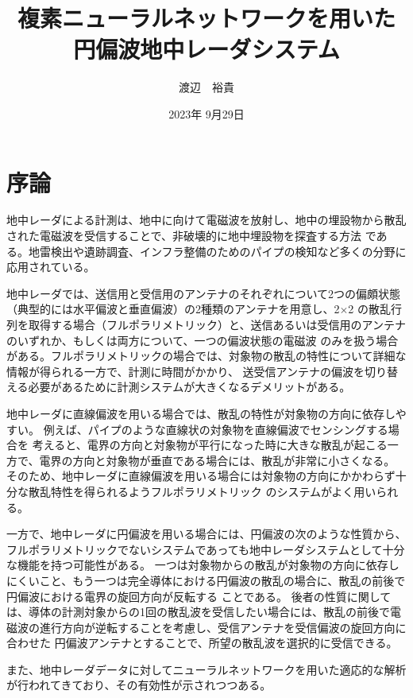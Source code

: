 \documentclass[11pt,a4paper,uplatex]{ujarticle}
\title{複素ニューラルネットワークを用いた\\円偏波地中レーダシステム}
\date{2023年 9月29日}
\author{渡辺　裕貴}
\begin{document}
\maketitle
\newpage
\tableofcontents
\newpage
\section{序論}

  地中レーダによる計測は、地中に向けて電磁波を放射し、地中の埋設物から散乱された電磁波を受信することで、非破壊的に地中埋設物を探査する方法
  である。地雷検出や遺跡調査、インフラ整備のためのパイプの検知など多くの分野に応用されている\cite{landmine_example}\cite{remains_example}。

  地中レーダでは、送信用と受信用のアンテナのそれぞれについて2つの偏頗状態（典型的には水平偏波と垂直偏波）の2種類のアンテナを用意し、2$\times$2
  の散乱行列を取得する場合（フルポラリメトリック）と、送信あるいは受信用のアンテナのいずれか、もしくは両方について、一つの偏波状態の電磁波
  のみを扱う場合がある。フルポラリメトリックの場合では、対象物の散乱の特性について詳細な情報が得られる一方で、計測に時間がかかり、
  送受信アンテナの偏波を切り替える必要があるために計測システムが大きくなるデメリットがある。

  地中レーダに直線偏波を用いる場合では、散乱の特性が対象物の方向に依存しやすい。
  例えば、パイプのような直線状の対象物を直線偏波でセンシングする場合を
  考えると、電界の方向と対象物が平行になった時に大きな散乱が起こる一方で、電界の方向と対象物が垂直である場合には、散乱が非常に小さくなる。
  そのため、地中レーダに直線偏波を用いる場合には対象物の方向にかかわらず十分な散乱特性を得られるようフルポラリメトリック
  のシステムがよく用いられる。
  
  一方で、地中レーダに円偏波を用いる場合には、円偏波の次のような性質から、フルポラリメトリックでないシステムであっても地中レーダシステムとして十分な機能を持つ可能性がある。
  一つは対象物からの散乱が対象物の方向に依存しにくいこと、もう一つは完全導体における円偏波の散乱の場合に、散乱の前後で円偏波における電界の旋回方向が反転する
  ことである。
  後者の性質に関しては、導体の計測対象からの1回の散乱波を受信したい場合には、散乱の前後で電磁波の進行方向が逆転することを考慮し、受信アンテナを受信偏波の旋回方向に合わせた
  円偏波アンテナとすることで、所望の散乱波を選択的に受信できる。

  また、地中レーダデータに対してニューラルネットワークを用いた適応的な解析が行われてきており、その有効性が示されつつある\cite{landmine_CNN}\cite{hidden_Markov}。
\end{document}
